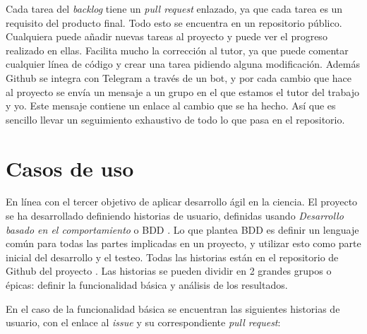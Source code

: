 Cada tarea del \emph{backlog} tiene un \emph{pull request} enlazado, ya que cada tarea es un requisito del producto final. Todo
esto se encuentra en un repositorio público. Cualquiera puede añadir nuevas tareas al proyecto y puede ver el progreso realizado en ellas.
Facilita mucho la corrección al tutor, ya que puede comentar cualquier línea de código y crear una tarea pidiendo alguna
modificación. Además Github se integra con Telegram a través de un bot, y por cada cambio que hace al proyecto se envía un mensaje
a un grupo en el que estamos el tutor del trabajo y yo. Este mensaje contiene un enlace al cambio que se ha hecho. Así
que es sencillo llevar un seguimiento exhaustivo de todo lo que pasa en el repositorio.

\section{Casos de uso}

En línea con el tercer objetivo de aplicar desarrollo ágil en la ciencia. El proyecto se ha desarrollado definiendo
historias de usuario, definidas usando \emph{Desarrollo basado en el comportamiento} o BDD \cite{BDD}. Lo que 
plantea BDD es definir un lenguaje común para todas las partes implicadas en un proyecto, y utilizar esto como parte inicial 
del desarrollo y el testeo. Todas las historias están en el repositorio de Github del proyecto \cite{project_repository}.
Las historias se pueden dividir en 2 grandes grupos o épicas: definir la funcionalidad básica y análisis de los resultados.

En el caso de la funcionalidad básica se encuentran las siguientes historias de usuario, con el enlace al
\emph{issue} y su correspondiente \emph{pull request}:


